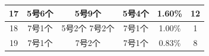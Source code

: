 \documentclass{article}
\begin{document}
\begin{table}[!h]
\begin{longtable}{|c|c|c|c|c|c|}
			17    & 5号6个                                                            & 5号9个                                                       & 5号4个                                                            & 1.60\% & 12  \\ \hline
			18    & 7号1个                                                            & 5号2个 7号2个                                                  & 7号1个                                                            & 1.00\% & 1   \\ \hline
			19    & 7号1个                                                            & 7号2个                                                       & 7号1个                                                            & 0.83\% & 8   \\ \hline
		\end{longtable}
	\end{table}
	
\end{document}
